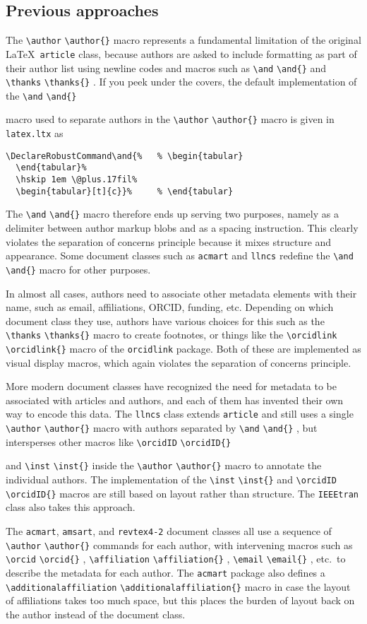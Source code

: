 \documentclass{article}
\newcommand{\cmd}[2][]{%
  \def\FirstArg{#1}%
  \ifx\FirstArg\empty%
    \texttt{\textbackslash{}#2}%
  \else%
    \texttt{\textbackslash{}#2\{#1\}}%
  \fi
}
\newcommand{\pkg}[1]{\texttt{#1}}
\begin{document}
\subsection{Previous approaches}
The \cmd{author} macro represents a fundamental limitation of the
original \LaTeX\ \pkg{article} class, because authors are asked to include
formatting as part of their author list using newline codes and
macros such as \cmd{and} and \cmd{thanks}.
If you peek under the covers, the default implementation of the \cmd{and}
macro used to separate authors in the \cmd{author} macro
is given in \texttt{latex.ltx} as
\begin{Verbatim}[samepage=true]
\DeclareRobustCommand\and{%   % \begin{tabular}
  \end{tabular}%
  \hskip 1em \@plus.17fil%
  \begin{tabular}[t]{c}}%     % \end{tabular}
\end{Verbatim}
 The
\cmd{and} macro therefore ends up serving two purposes, namely as a delimiter
between author markup blobs and as a spacing instruction. This clearly
violates the separation of concerns principle because it mixes
structure and appearance. Some document classes such as \texttt{acmart} and
\texttt{llncs} redefine the \cmd{and} macro for other purposes.

In almost all cases, authors need to associate other metadata elements with their
name, such as email, affiliations, ORCID, funding, etc. Depending on which document
class they use, authors have various choices
for this such as the \cmd{thanks} macro to create footnotes, or things
like the \cmd{orcidlink} macro of the \texttt{orcidlink} package. Both of these
are implemented as visual display macros, which again violates the separation
of concerns principle.

More modern document classes
have recognized the need for metadata to be associated with articles
and authors, and each of them has invented their own way to encode
this data.  The \pkg{llncs} class extends \pkg{article} and still uses a
single \cmd{author} macro with authors separated by \cmd{and},
but intersperses other macros like \cmd{orcidID}
and \cmd{inst} inside the \cmd{author} macro to annotate the
individual authors. The implementation of the \cmd{inst} and
\cmd{orcidID} macros are still based on layout rather than structure.
The \pkg{IEEEtran} class also takes this approach.

The \pkg{acmart}, \pkg{amsart}, and \pkg{revtex4-2} document classes
all use a sequence of \cmd{author} commands for each author, with
intervening macros such
as \cmd{orcid}, \cmd{affiliation}, \cmd{email}, etc.\ to describe the
metadata for each author.  The \pkg{acmart} package also defines a
\cmd{additionalaffiliation} macro in case the layout of affiliations
takes too much space, but this places the burden of layout back on
the author instead of the document class.
\end{document}
